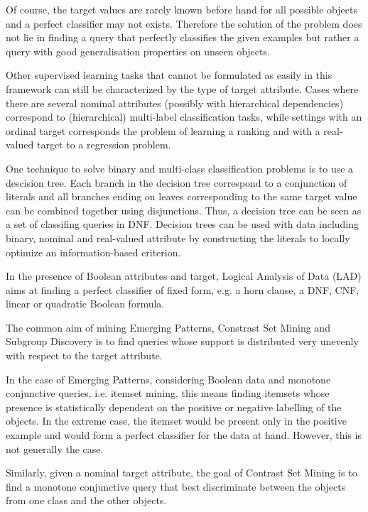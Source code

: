 \documentclass[a4paper,10pt]{article}
\begin{document}
Of course, the target values are rarely known before hand for all
possible objects and a perfect classifier may not exists. Therefore
the solution of the problem does not lie in finding a query that
perfectly classifies the given examples but rather a query with good
generalisation properties on unseen objects.

Other supervised learning tasks that cannot be formulated as easily in
this framework can still be characterized by the type of target
attribute. Cases where there are several nominal attributes (possibly
with hierarchical dependencies) correspond to (hierarchical)
multi-label classification tasks, while settings with an ordinal
target corresponds the problem of learning a ranking and with a
real-valued target to a regression problem.

One technique to solve binary and multi-class classification problems
is to use a descision tree.  Each branch in the decision tree
correspond to a conjunction of literals and all branches ending on
leaves corresponding to the same target value can be combined together
using disjunctions. Thus, a decision tree can be seen as a set of
classifing queries in DNF. Decision trees can be used with data
including binary, nominal and real-valued attribute by constructing
the literals to locally optimize an information-based criterion.

In the presence of Boolean attributes and target, Logical Analysis of
Data (LAD) \cite{boros00implementation} aims at finding a perfect
classifier of fixed form, e.g. a horn clause, a DNF, CNF, linear or
quadratic Boolean formula.

The common aim of mining Emerging Patterns, Constrast Set Mining and Subgroup Discovery
is to find queries whose support is distributed very unevenly with respect to the target attribute.

In the case of Emerging Patterns, considering Boolean data and
monotone conjunctive queries, i.e. itemset mining, this means finding
itemsets whose presence is statistically dependent on the positive or negative labelling of
the objects. In the extreme case, the itemset would be present only in the positive example and would form a perfect classifier for the data at hand. However, this is not generally the case. 

Similarly, given a nominal target attribute, the goal of Contrast Set
Mining is to find a monotone conjunctive query that best discriminate
between the objects from one class and the other objects.
\end{document}
